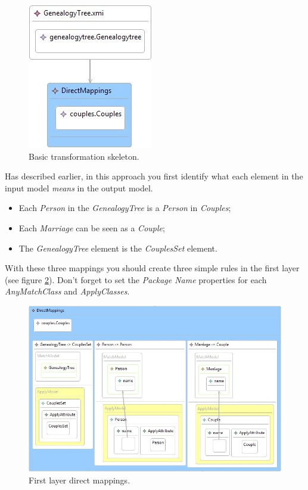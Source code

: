 \begin{figure}[h]
\begin{center}
  \includegraphics[scale=0.7]{imgs/part_trans_rule_bas.jpg}
  \caption{Basic transformation skeleton.}
  \label{fig:part_trans_rule_bas}
\end{center}
\end{figure}

Has described earlier, in this approach you first identify what each element in
the input model \emph{means} in the output model.

\begin{itemize}
  \item Each \emph{Person} in the \emph{GenealogyTree} is a \emph{Person} in
  \emph{Couples};
  \item Each \emph{Marriage} can be seen as a \emph{Couple};
  \item The \emph{GenealogyTree} element is the \emph{CouplesSet} element.
\end{itemize}

With these three mappings you should create three simple rules in the first
layer (see figure \ref{fig:first_rule_direct_mappings}). Don't forget to set the
\emph{Package Name} properties for each \emph{AnyMatchClass} and
\emph{ApplyClasses}.


\begin{figure}[h]
\begin{center}
  \includegraphics[scale=0.7]{imgs/first_rule_direct_mappings.jpg}
  \caption{First layer direct mappings.}
  \label{fig:first_rule_direct_mappings}
\end{center}
\end{figure}

